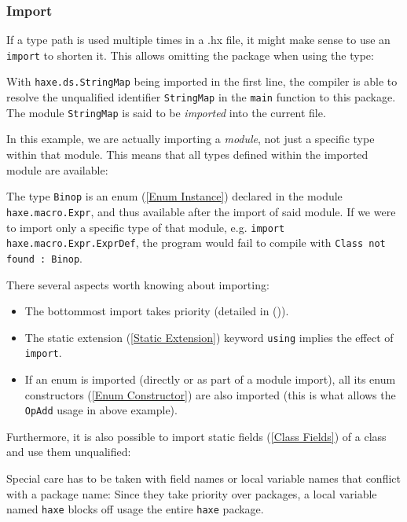 \documentclass{article}
\newcommand{\type}[1]{\texttt{#1}}
\newcommand{\expr}[1]{\texttt{#1}}
\newcommand{\Fullref}[1]{\nameref{#1} (\Cref{#1})}
\newcommand{\tref}[2]{#1 (\ref{#2})}
\begin{document}
\subsubsection{Import}
\label{Import}

If a type path is used multiple times in a .hx file, it might make sense to use an \expr{import} to shorten it. This allows omitting the package when using the type:



With \expr{haxe.ds.StringMap} being imported in the first line, the compiler is able to resolve the unqualified identifier \expr{StringMap} in the \expr{main} function to this package. The module \type{StringMap} is said to be \emph{imported} into the current file.

In this example, we are actually importing a \emph{module}, not just a specific type within that module. This means that all types defined within the imported module are available:



The type \type{Binop} is an \tref{enum}{Enum Instance} declared in the module \type{haxe.macro.Expr}, and thus available after the import of said module. If we were to import only a specific type of that module, e.g. \expr{import haxe.macro.Expr.ExprDef}, the program would fail to compile with \expr{Class not found : Binop}.

There several aspects worth knowing about importing:

\begin{itemize}
	\item The bottommost import takes priority (detailed in \Fullref{Resolution Order}).
	\item The \tref{static extension}{Static Extension} keyword \expr{using} implies the effect of \expr{import}.
	\item If an enum is imported (directly or as part of a module import), all its \tref{enum constructors}{Enum Constructor} are also imported (this is what allows the \expr{OpAdd} usage in above example).
\end{itemize}

Furthermore, it is also possible to import \tref{static fields}{Class Fields} of a class and use them unqualified:




Special care has to be taken with field names or local variable names that conflict with a package name: Since they take priority over packages, a local variable named \expr{haxe} blocks off usage the entire \expr{haxe} package.
\end{document}
